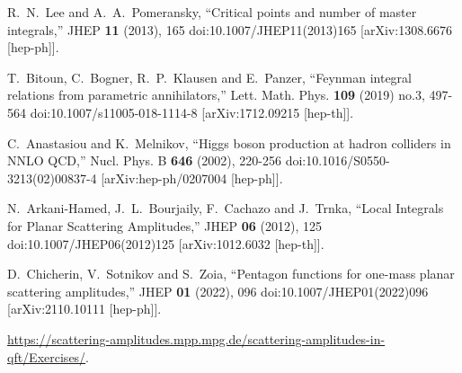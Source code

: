 R.~N.~Lee and A.~A.~Pomeransky,
``Critical points and number of master integrals,''
JHEP \textbf{11} (2013), 165
doi:10.1007/JHEP11(2013)165
[arXiv:1308.6676 [hep-ph]].

T.~Bitoun, C.~Bogner, R.~P.~Klausen and E.~Panzer,
``Feynman integral relations from parametric annihilators,''
Lett. Math. Phys. \textbf{109} (2019) no.3, 497-564
doi:10.1007/s11005-018-1114-8
[arXiv:1712.09215 [hep-th]].

C.~Anastasiou and K.~Melnikov,
``Higgs boson production at hadron colliders in NNLO QCD,''
Nucl. Phys. B \textbf{646} (2002), 220-256
doi:10.1016/S0550-3213(02)00837-4
[arXiv:hep-ph/0207004 [hep-ph]].

N.~Arkani-Hamed, J.~L.~Bourjaily, F.~Cachazo and J.~Trnka,
``Local Integrals for Planar Scattering Amplitudes,''
JHEP \textbf{06} (2012), 125
doi:10.1007/JHEP06(2012)125
[arXiv:1012.6032 [hep-th]].

D.~Chicherin, V.~Sotnikov and S.~Zoia,
``Pentagon functions for one-mass planar scattering amplitudes,''
JHEP \textbf{01} (2022), 096
doi:10.1007/JHEP01(2022)096
[arXiv:2110.10111 [hep-ph]].

\href{https://scattering-amplitudes.mpp.mpg.de/scattering-amplitudes-in-qft/Exercises/}{https://scattering-amplitudes.mpp.mpg.de/scattering-amplitudes-in-qft/Exercises/}.